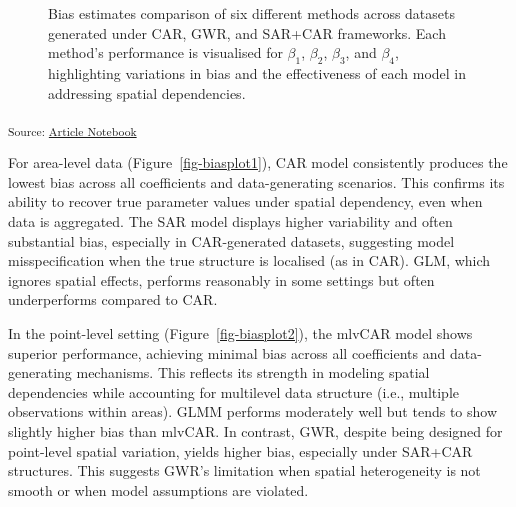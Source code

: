 \documentclass[
  default,
]{sn-jnl}
\begin{document}
\begin{figure}
\begin{minipage}{0.50\linewidth}
{}


\end{minipage}%

\caption{\label{fig-biasplot}Bias estimates comparison of six different
methods across datasets generated under CAR, GWR, and SAR+CAR
frameworks. Each method's performance is visualised for \(\beta_1\),
\(\beta_2\), \(\beta_3\), and \(\beta_4\), highlighting variations in
bias and the effectiveness of each model in addressing spatial
dependencies.}

\end{figure}%

\textsubscript{Source:
\href{https://indiraputeri-phd.github.io/CAR_simcomp/manuscript.qmd.html}{Article
Notebook}}

For area-level data (Figure~\ref{fig-biasplot1}), CAR model consistently
produces the lowest bias across all coefficients and data-generating
scenarios. This confirms its ability to recover true parameter values
under spatial dependency, even when data is aggregated. The SAR model
displays higher variability and often substantial bias, especially in
CAR-generated datasets, suggesting model misspecification when the true
structure is localised (as in CAR). GLM, which ignores spatial effects,
performs reasonably in some settings but often underperforms compared to
CAR.

In the point-level setting (Figure~\ref{fig-biasplot2}), the mlvCAR
model shows superior performance, achieving minimal bias across all
coefficients and data-generating mechanisms. This reflects its strength
in modeling spatial dependencies while accounting for multilevel data
structure (i.e., multiple observations within areas). GLMM performs
moderately well but tends to show slightly higher bias than mlvCAR. In
contrast, GWR, despite being designed for point-level spatial variation,
yields higher bias, especially under SAR+CAR structures. This suggests
GWR's limitation when spatial heterogeneity is not smooth or when model
assumptions are violated.

\begingroup\fontsize{9}{11}\selectfont
\end{document}
